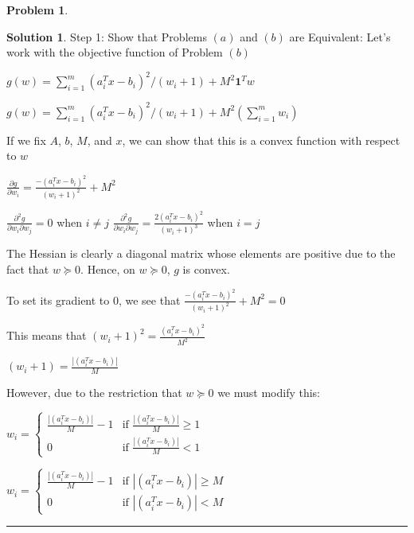 \documentclass{article}
\theoremstyle{definition}
\newtheorem{problem}{Problem}
\def\fline{\rule{0.75\linewidth}{0.5pt}}
\newcommand{\finishline}{\begin{center}\fline\end{center}}
\newtheorem*{solution*}{Solution}
\newenvironment{solution}{\begin{solution*}}{{\finishline} \end{solution*}}
\begin{document}
\begin{problem}
\begin{solution}
Step 1: Show that Problems $(a)$ and $(b)$ are Equivalent: \newline 
Let's work with the objective function of Problem $(b)$ \newline 

$g(w) = \sum_{i=1}^{m} (a_i^T x - b_i)^2/(w_i + 1) + M^2\textbf{1}^Tw$ \newline 

$g(w) = \sum_{i=1}^{m} (a_i^T x - b_i)^2/(w_i + 1) + M^2(\sum_{i=1}^{m} w_i)$ \newline 

If we fix $A$, $b$, $M$, and $x$, we can show that this is a convex function with respect to $w$ \newline

$\frac{\partial g}{\partial w_i} = \frac{-(a_i^T x - b_i)^2}{(w_i + 1)^2} + M^2$ \newline

$\frac{\partial^2g}{\partial w_i \partial w_j} = 0$ when $i \neq j$ \newline
$\frac{\partial^2g}{\partial w_i \partial w_j} = \frac{2(a_i^T x - b_i)^2}{(w_i + 1)^3}$ when $i = j$ \newline

The Hessian is clearly a diagonal matrix whose elements are positive due to the fact that $w \succeq 0$. Hence, on $w \succeq 0$, $g$ is convex. 

To set its gradient to 0, we see that $\frac{-(a_i^T x - b_i)^2}{(w_i + 1)^2} + M^2 = 0$

This means that $(w_i + 1)^2 = \frac{(a_i^T x - b_i)^2}{M^2}$ \newline 

$(w_i + 1) = \frac{|(a_i^T x - b_i)|}{M}$ \newline 

However, due to the restriction that $w \succeq 0$ we must modify this: \newline

$w_i = \begin{cases} 
      \frac{|(a_i^T x - b_i)|}{M} - 1 & \text{if } \frac{|(a_i^T x - b_i)|}{M} \geq 1 \\
      0 & \text{if } \frac{|(a_i^T x - b_i)|}{M} < 1 
   \end{cases}$

$w_i = \begin{cases} 
      \frac{|(a_i^T x - b_i)|}{M} - 1 & \text{if } |(a_i^T x - b_i)| \geq M \\
      0 & \text{if } |(a_i^T x - b_i)| < M
   \end{cases}$


\end{solution}
\end{problem}
\end{document}
